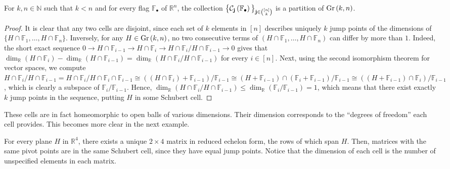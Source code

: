 \begin{lemma}\label{lem:jump_pts} For $k,n\in\mathbb{N}$ such that $k<n$ and for every flag $\mathbb{F}_{\bullet}$ of $\mathbb{R}^n$, the collection  $\big\{\mathcal{C}_{\mathbf{j}}\left(\mathbb{F}_{\bullet}\right)\big\}_{\mathbf{j}\in\binom{[n]}{k}}$ is a partition of $\Gr{k}{n}$.
\end{lemma}
\begin{proof} It is clear that any two cells are disjoint, since each set of $k$ elements in $[n]$ describes uniquely $k$ jump points of the dimensions of $\{H\cap\mathbb{F}_1,\ldots,H\cap\mathbb{F}_n\}$. Inversely, for any $H\in\Gr{k}{n}$, no two consecutive terms of $(H\cap\mathbb{F}_1,\ldots,H\cap\mathbb{F}_n)$ can differ by more than $1$. Indeed, the short exact sequence $0\to H\cap\mathbb{F}_{i-1}\to H\cap\mathbb{F}_i\to H\cap\mathbb{F}_i/H\cap\mathbb{F}_{i-1}\to0$ gives that $\dim_{\mathbb{R}}(H\cap\mathbb{F}_i)-\dim_{\mathbb{R}}(H\cap\mathbb{F}_{i-1})=\dim_{\mathbb{R}}(H\cap\mathbb{F}_i/H\cap\mathbb{F}_{i-1})$ for every $i\in[n]$. Next, using the second isomorphism theorem for vector spaces, we compute $H\cap\mathbb{F}_i/H\cap\mathbb{F}_{i-1}=H\cap\mathbb{F}_i/H\cap\mathbb{F}_i\cap\mathbb{F}_{i-1}\cong((H\cap\mathbb{F}_i)+\mathbb{F}_{i-1})/\mathbb{F}_{i-1}\cong(H+\mathbb{F}_{i-1})\cap(\mathbb{F}_i+\mathbb{F}_{i-1})/\mathbb{F}_{i-1}\cong((H+\mathbb{F}_{i-1})\cap\mathbb{F}_i)/\mathbb{F}_{i-1}$, which is clearly a subspace of $\mathbb{F}_i/\mathbb{F}_{i-1}$. Hence, $\dim_{\mathbb{R}}(H\cap\mathbb{F}_i/H\cap\mathbb{F}_{i-1})\leq\dim_{\mathbb{R}}(\mathbb{F}_i/\mathbb{F}_{i-1})=1$, which means that there exist exactly $k$ jump points in the sequence, putting $H$ in some Schubert cell.
\end{proof}

These cells are in fact homeomorphic to open balls of various dimensions. Their dimension corresponds to the ``degrees of freedom'' each cell provides. This becomes more clear in the next example.

\begin{example} For every plane $H$ in $\mathbb{R}^4$, there exists a unique $2\times 4$ matrix in reduced echelon form, the rows of which span $H$. Then, matrices with the same pivot points are in the same Schubert cell, since they have equal jump points. Notice that the dimension of each cell is the number of unspecified elements in each matrix.
\begin{center}
\end{center}
\end{example}

